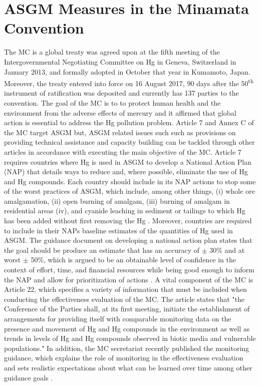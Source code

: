 \section{ASGM Measures in the Minamata Convention}
The MC is a global treaty was agreed upon at the fifth meeting of the Intergovernmental Negotiating Committee on Hg in Geneva, Switzerland in January 2013, and formally adopted in October that year in Kumamoto, Japan. Moreover, the treaty entered into force on 16 August 2017, 90 days after the 50\textsuperscript{th} instrument of ratification was deposited and currently has 137 parties to the convention\cite{unep_minamata_2019}. The goal of the MC is to to protect human health and the environment from the adverse effects of mercury and it affirmed that global action is essential to address the Hg pollution problem. Article 7 and Annex C of the MC target ASGM but, ASGM related issues such such as provisions on providing technical assistance and capacity building can be tackled through other articles in accordance with executing the main objective of the MC. Article 7 requires countries where Hg is used in ASGM to develop a National Action Plan (NAP) that details ways to reduce and, where possible, eliminate the use of Hg and Hg compounds. Each country should include in its NAP actions to stop some of the worst practices of ASGM, which include, among other things, (i) whole ore amalgamation, (ii) open burning of amalgam, (iii) burning of amalgam in residential areas (iv), and cyanide leaching in sediment or tailings to which Hg has been added without first removing the Hg \cite{unep_minamata_2019}. Moreover, countries are required to include in their NAPs baseline estimates of the quantities of Hg used in ASGM. The guidance document on developing a national action plan states that the goal should be produce an estimate that has an accuracy of $\pm$ 30\% and at worst $\pm$ 50\%, which is argued to be an obtainable level of confidence in the context of effort, time, and financial resources while being good enough to inform the NAP and allow for prioritization of actions \cite{programme_estimating_2017}. A vital component of the MC is Article 22, which specifies a variety of information that must be included when conducting the effectiveness evaluation of the MC. The article states that "the Conference of the Parties shall, at its first meeting, initiate the establishment of arrangements for providing itself with comparable monitoring data on the presence and movement of Hg and Hg compounds in the environment as well as trends in levels of Hg and Hg compounds observed in biotic media and vulnerable populations." In addition, the MC secretariat recently published the monitoring guidance, which explains the role of monitoring in the effectiveness evaluation and sets realistic expectations about what can be learned over time among other guidance goals \cite{unep_guidance_2021}. 

